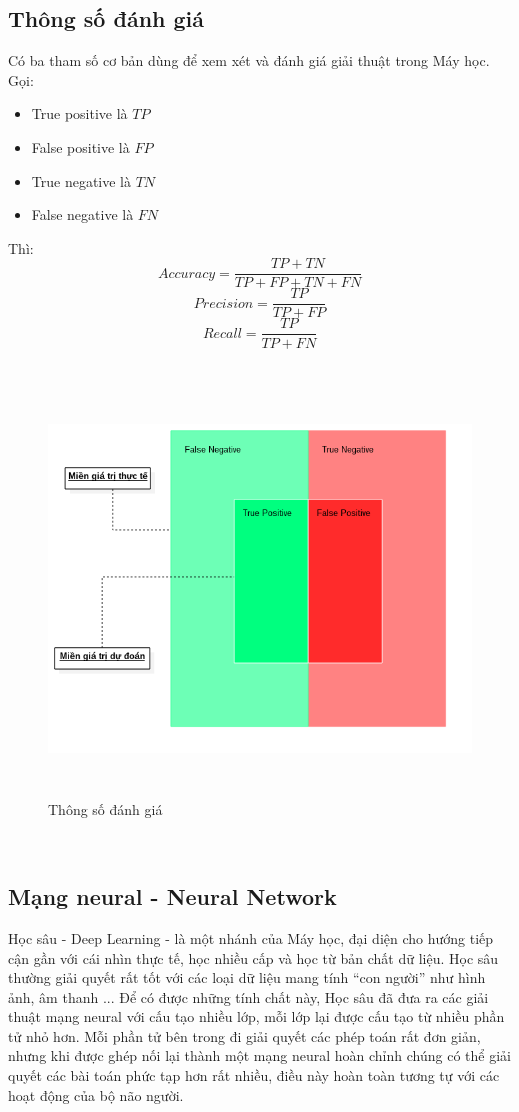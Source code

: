 \subsection{Thông số đánh giá}
Có ba tham số cơ bản dùng để xem xét và đánh giá giải thuật trong Máy học.
Gọi:
\begin{itemize}
\item True positive là $TP$
\item False positive là $FP$
\item True negative là $TN$
\item False negative là $FN$
\end{itemize}
Thì:\\
\[
  Accuracy = \frac{TP+TN}{TP+FP+TN+FN}
\]
\[
  Precision = \frac{TP}{TP+FP}
\]
\[
  Recall = \frac{TP}{TP+FN}
\]\\
\begin{figure}[h!]
\centering
\includegraphics[height=4.3in, keepaspectratio=true]{precision_recall.png}
\caption{Thông số đánh giá}
\end{figure}\\
\subsection{Mạng neural - Neural Network}
Học sâu - Deep Learning - là một nhánh của Máy học, đại diện cho hướng tiếp 
cận gần với cái nhìn thực tế, học nhiều cấp và học từ bản chất dữ liệu. Học 
sâu thường giải quyết rất tốt với các loại dữ liệu mang tính ``con người'' 
như hình ảnh, âm thanh ... Để có được những tính chất này, Học sâu đã đưa ra 
các giải thuật mạng neural với cấu tạo nhiều lớp, mỗi lớp lại được cấu tạo từ 
nhiều phần tử nhỏ hơn. Mỗi phần tử bên trong đi giải quyết các phép toán rất 
đơn giản, nhưng khi được ghép nối lại thành một mạng neural hoàn chỉnh chúng có 
thể giải quyết các bài toán phức tạp hơn rất nhiều, điều này hoàn toàn tương tự 
với các hoạt động của bộ não người. \cite{NeuralNetworksandDeepLearning} 
